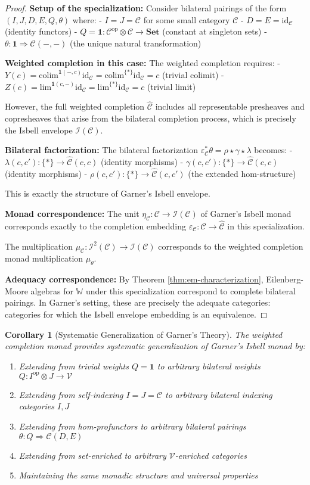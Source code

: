 \documentclass[11pt]{article}
\theoremstyle{plain}
\newtheorem{corollary}[theorem]{Corollary}
\theoremstyle{definition}
\theoremstyle{remark}
\newcommand{\V}{\mathcal{V}}
\newcommand{\C}{\mathcal{C}}
\newcommand{\op}{\mathrm{op}}
\newcommand{\id}{\mathrm{id}}
\newcommand{\colim}{\mathrm{colim}}
\renewcommand{\lim}{\mathrm{lim}}
\newcommand{\wh}[1]{\widehat{#1}}
\begin{document}
\begin{proof}
\textbf{Setup of the specialization:}
Consider bilateral pairings of the form $(I, J, D, E, Q, θ)$ where:
- $I = J = \C$ for some small category $\C$
- $D = E = \id_\C$ (identity functors)
- $Q = \mathbf{1} : \C^{\op} \otimes \C → \mathbf{Set}$ (constant at singleton sets)
- $θ : \mathbf{1} \Rightarrow \C(-, -)$ (the unique natural transformation)

\textbf{Weighted completion in this case:}
The weighted completion requires:
- $Y(c) = \colim^{\mathbf{1}(-, c)} \id_\C = \colim^{\{*\}} \id_\C = c$ (trivial colimit)
- $Z(c) = \lim^{\mathbf{1}(c, -)} \id_\C = \lim^{\{*\}} \id_\C = c$ (trivial limit)

However, the full weighted completion $\wh{\C}$ includes all representable presheaves and copresheaves that arise from the bilateral completion process, which is precisely the Isbell envelope $\mathcal{I}(\C)$.

\textbf{Bilateral factorization:}
The bilateral factorization $\varepsilon_\C^* θ = ρ \star γ \star λ$ becomes:
- $λ(c, c') : \{*\} → \wh{\C}(c, c)$ (identity morphisms)
- $γ(c, c') : \{*\} → \wh{\C}(c, c)$ (identity morphisms)  
- $ρ(c, c') : \{*\} → \wh{\C}(c, c')$ (the extended hom-structure)

This is exactly the structure of Garner's Isbell envelope.

\textbf{Monad correspondence:}
The unit $η_\C : \C → \mathcal{I}(\C)$ of Garner's Isbell monad corresponds exactly to the completion embedding $\varepsilon_\C : \C → \wh{\C}$ in this specialization.

The multiplication $μ_\C : \mathcal{I}^2(\C) → \mathcal{I}(\C)$ corresponds to the weighted completion monad multiplication $μ_θ$.

\textbf{Adequacy correspondence:}
By Theorem \ref{thm:em-characterization}, Eilenberg-Moore algebras for $\mathbb{W}$ under this specialization correspond to complete bilateral pairings. In Garner's setting, these are precisely the adequate categories: categories for which the Isbell envelope embedding is an equivalence.
\end{proof}

\begin{corollary}[Systematic Generalization of Garner's Theory]\label{cor:garner-generalization}
The weighted completion monad provides systematic generalization of Garner's Isbell monad by:
\begin{enumerate}
\item Extending from trivial weights $Q = \mathbf{1}$ to arbitrary bilateral weights $Q : I^{\op} \otimes J → \V$
\item Extending from self-indexing $I = J = \C$ to arbitrary bilateral indexing categories $I, J$
\item Extending from hom-profunctors to arbitrary bilateral pairings $θ : Q \Rightarrow \C(D, E)$
\item Extending from set-enriched to arbitrary $\V$-enriched categories
\item Maintaining the same monadic structure and universal properties
\end{enumerate}
\end{corollary}
\end{document}
